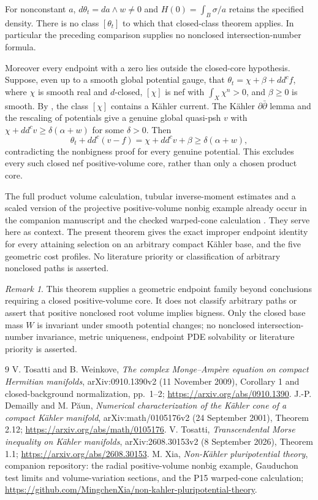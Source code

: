 \documentclass[11pt]{article}
\newcommand{\ddc}{dd^c}
\theoremstyle{remark}\newtheorem{remark}[theorem]{Remark}
\begin{document}
For nonconstant $a$, $d\theta_t=da\wedge w\ne0$ and
$H(0)=\int_B\sigma/a$ retains the specified density.
There is no class $[\theta_t]$ to which that closed-class theorem applies.
In particular the preceding comparison supplies no nonclosed
intersection-number formula.

Moreover every endpoint with a zero lies outside the closed-core
hypothesis. Suppose, even up to a smooth global potential gauge, that
$\theta_t=\chi+\beta+\ddc f$, where $\chi$ is smooth real and
$d$-closed, $[\chi]$ is nef with $\int_X\chi^n>0$, and
$\beta\geq0$ is smooth. By \cite[Theorem 2.12]{DP}, the class
$[\chi]$ contains a K\"ahler current. The K\"ahler
$\partial\bar\partial$ lemma and the rescaling of potentials give a
genuine global quasi-psh $v$ with
$\chi+\ddc v\geq\delta(\alpha+w)$ for some $\delta>0$.
Then
\[
 \theta_t+\ddc(v-f)=\chi+\ddc v+\beta
 \geq\delta(\alpha+w),
\]
contradicting the nonbigness proof for every genuine potential.
This excludes every such closed nef positive-volume core, rather than
only a chosen product core.

The full product volume calculation, tubular inverse-moment estimates
and a scaled version of the projective positive-volume nonbig example
already occur in the companion manuscript and the checked warped-cone
calculation \cite{Companion}. They serve here as context.
The present theorem gives the exact improper endpoint identity for
every attaining selection on an arbitrary compact K\"ahler base,
and the five geometric cost profiles. No literature priority or
classification of arbitrary nonclosed paths is asserted.

\begin{remark}
This theorem supplies a geometric endpoint family beyond conclusions
requiring a closed positive-volume core. It does not classify arbitrary
paths or assert that positive nonclosed root volume implies bigness.
Only the closed base mass $W$ is invariant under smooth potential
changes; no nonclosed intersection-number invariance, metric uniqueness,
endpoint PDE solvability or literature priority is asserted.
\end{remark}
\begin{thebibliography}{9}
 V. Tosatti and B. Weinkove, \emph{The complex Monge--Amp\`ere
equation on compact Hermitian manifolds}, arXiv:0910.1390v2
(11 November 2009), Corollary 1 and closed-background normalization,
pp.~1--2; \url{https://arxiv.org/abs/0910.1390}.
 J.-P. Demailly and M. P\u{a}un,
\emph{Numerical characterization of the K\"ahler cone of a compact
K\"ahler manifold}, arXiv:math/0105176v2 (24 September 2001),
Theorem 2.12; \url{https://arxiv.org/abs/math/0105176}.
 V. Tosatti, \emph{Transcendental Morse inequality on
K\"ahler manifolds}, arXiv:2608.30153v2 (8 September 2026),
Theorem 1.1; \url{https://arxiv.org/abs/2608.30153}.
 M. Xia, \emph{Non-K\"ahler pluripotential theory},
companion repository: the radial positive-volume nonbig example,
Gauduchon test limits and volume-variation sections, and the
P15 warped-cone calculation;
\url{https://github.com/MingchenXia/non-kahler-pluripotential-theory}.
\end{thebibliography}
\end{document}
